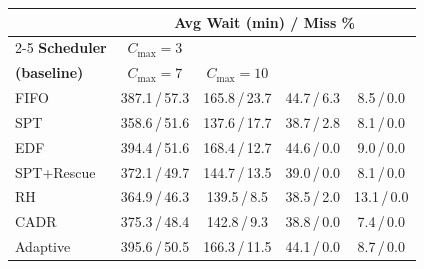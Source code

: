 \begin{tabular}{lcccc}
\toprule
& \multicolumn{4}{c}{\textbf{Avg Wait (min) / Miss \%}} \\
\cmidrule(lr){2-5}
\textbf{Scheduler} & $C_{\max}=3$ & \shortstack{$C_{\max}=5$ \\ \textbf{(baseline)}} & $C_{\max}=7$ & $C_{\max}=10$ \\
\midrule
FIFO & 387.1\,/\,57.3 & 165.8\,/\,23.7 & 44.7\,/\,6.3 & 8.5\,/\,0.0 \\
SPT & 358.6\,/\,51.6 & 137.6\,/\,17.7 & 38.7\,/\,2.8 & 8.1\,/\,0.0 \\
EDF & 394.4\,/\,51.6 & 168.4\,/\,12.7 & 44.6\,/\,0.0 & 9.0\,/\,0.0 \\
SPT+Rescue & 372.1\,/\,49.7 & 144.7\,/\,13.5 & 39.0\,/\,0.0 & 8.1\,/\,0.0 \\
RH & 364.9\,/\,46.3 & 139.5\,/\,8.5 & 38.5\,/\,2.0 & 13.1\,/\,0.0 \\
CADR & 375.3\,/\,48.4 & 142.8\,/\,9.3 & 38.8\,/\,0.0 & 7.4\,/\,0.0 \\
Adaptive & 395.6\,/\,50.5 & 166.3\,/\,11.5 & 44.1\,/\,0.0 & 8.7\,/\,0.0 \\
\bottomrule
\end{tabular}
